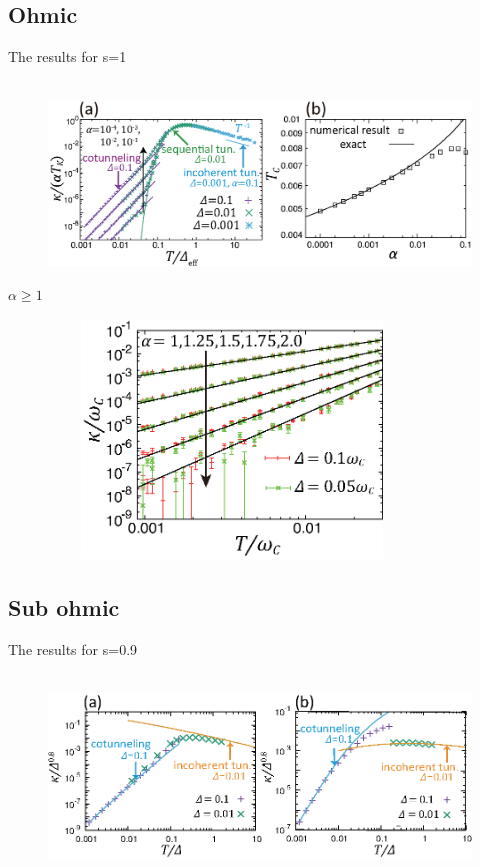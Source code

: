 \subsection{Ohmic}
The results for s=1
\begin{figure}[tb]
　\centering
　\includegraphics[width=165mm]{conductance_s1.eps}
　\caption{}
\end{figure}

$\alpha\geq1$
\begin{figure}[tb]
　\centering
　\includegraphics[width=80mm]{ohmic_incoherent_tunneling.eps}
　\caption{}
\end{figure}

\subsection{Sub ohmic}
The results for s=0.9
\begin{figure}[tb]
　\centering
　\includegraphics[width=165mm]{conductance_s0.9.eps}
　\caption{}
\end{figure}

